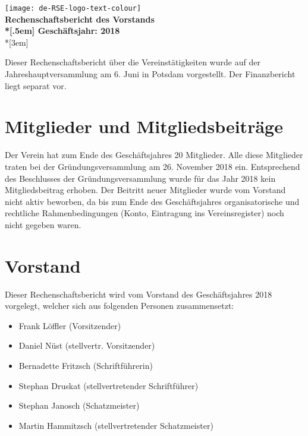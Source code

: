 \newcommand{\jahr}{2018}



\thispagestyle{empty}

\begin{centering}
\texttt{[image: de-RSE-logo-text-colour]}\\
\vspace{3em}
\textbf{
 \Large Rechenschaftsbericht des Vorstands\\*[.5em]
 \normalsize Geschäftsjahr: \jahr}\\*[3em]
\end{centering}



Dieser Rechenschaftsbericht über die Vereinstätigkeiten wurde auf der Jahreshauptversammlung am 6. Juni in Potsdam vorgestellt.
Der Finanzbericht liegt separat vor.

\section{Mitglieder und Mitgliedsbeiträge}

Der Verein hat zum Ende des Geschäftsjahres 20 Mitglieder.
Alle diese Mitglieder traten bei der Gründungsversammlung am 26. November 2018 ein.
Entsprechend des Beschlusses der Gründungsversammlung wurde für das Jahr 2018 kein Mitgliedsbeitrag erhoben.
Der Beitritt neuer Mitglieder wurde vom Vorstand nicht aktiv beworben, da bis zum Ende des Geschäftsjahres organisatorische und rechtliche Rahmenbedingungen (Konto, Eintragung ins Vereinsregister) noch nicht gegeben waren.

\section{Vorstand}

Dieser Rechenschaftsbericht wird vom Vorstand des Geschäftsjahres 2018 vorgelegt, welcher sich aus folgenden Personen zusammensetzt:

\begin{itemize}
  \setlength{\itemsep}{0pt plus 1pt}
  \item Frank Löffler (Vorsitzender)
  \item Daniel Nüst (stellvertr. Vorsitzender)
  \item Bernadette Fritzsch (Schriftführerin)
  \item Stephan Druskat (stellvertretender Schriftführer)
  \item Stephan Janosch (Schatzmeister)
  \item Martin Hammitzsch (stellvertretender Schatzmeister)
\end{itemize}

